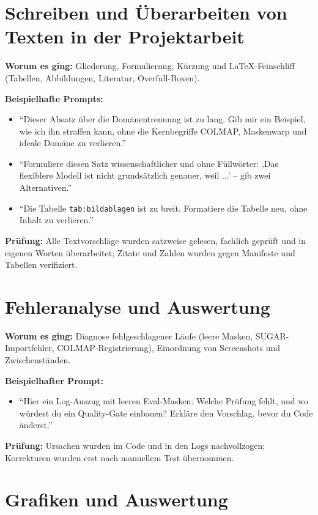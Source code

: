 \documentclass[12pt,a4paper]{article}
\begin{document}
\section{Schreiben und Überarbeiten von Texten in der Projektarbeit}

\textbf{Worum es ging:} Gliederung, Formulierung, Kürzung und LaTeX-Feinschliff (Tabellen, Abbildungen, Literatur, Overfull-Boxen).

\textbf{Beispielhafte Prompts:}
\begin{itemize}
  \item \enquote{Dieser Absatz über die Domänentrennung ist zu lang. Gib mir ein Beispiel, wie ich ihn straffen kann, ohne die Kernbegriffe COLMAP, Maskenwarp und ideale Domäne zu verlieren.}
  \item \enquote{Formuliere diesen Satz wissenschaftlicher und ohne Füllwörter: ,Das flexiblere Modell ist nicht grundsätzlich genauer, weil ...' -- gib zwei Alternativen.}
  \item \enquote{Die Tabelle \texttt{tab:bildablagen} ist zu breit. Formatiere die Tabelle neu, ohne Inhalt zu verlieren.}
\end{itemize}

\textbf{Prüfung:} Alle Textvorschläge wurden satzweise gelesen, fachlich geprüft und in eigenen Worten überarbeitet; Zitate und Zahlen wurden gegen Manifeste und Tabellen verifiziert.

\section{Fehleranalyse und Auswertung}

\textbf{Worum es ging:} Diagnose fehlgeschlagener Läufe (leere Masken, SUGAR-Importfehler, COLMAP-Registrierung), Einordnung von Screenshots und Zwischenständen.

\textbf{Beispielhafter Prompt:}
\begin{itemize}
  \item \enquote{Hier ein Log-Auszug mit leeren Eval-Masken. Welche Prüfung fehlt, und wo würdest du ein Quality-Gate einbauen? Erkläre den Vorschlag, bevor du Code änderst.}
\end{itemize}

\textbf{Prüfung:} Ursachen wurden im Code und in den Logs nachvollzogen; Korrekturen wurden erst nach manuellem Test übernommen.

\section{Grafiken und Auswertung}
\end{document}
